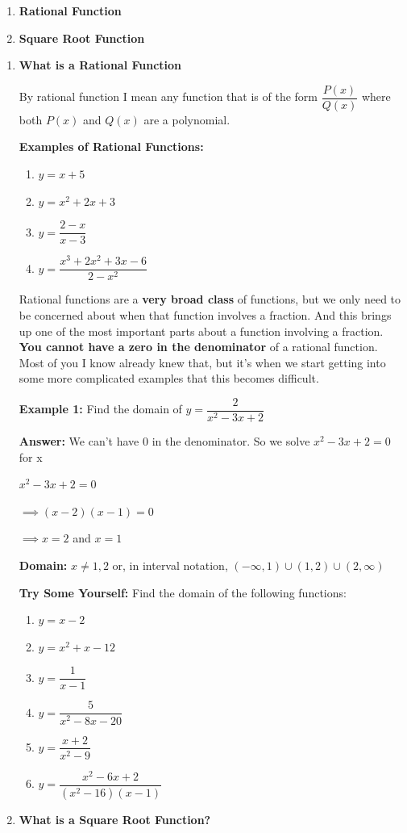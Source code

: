 \documentclass[12pt]{article}
\begin{document}
\begin{enumerate}
\item \textbf{Rational Function}
\item \textbf{Square Root Function}
\end{enumerate}
\hrulefill
\begin{enumerate}
\item \textbf{What is a Rational Function}

By rational function I mean any function that is of the form $\dfrac{P(x)}{Q(x)}$ where both $P(x)$ and $Q(x)$ are a polynomial. 

\textbf{Examples of Rational Functions:}

\begin{enumerate}
\item $y  = x+5$
\item $y = x^2+2x+3$
\item $y = \dfrac{2-x}{x-3}$
\item $y = \dfrac{x^3+2x^2+3x-6}{2-x^2}$
\end{enumerate}

Rational functions are a \textbf{very broad class} of functions, but we only need to be concerned about when that function involves a fraction. And this brings up one of the most important parts about a function involving a fraction. \textbf{You cannot have a zero in the denominator} of a rational function. Most of you I know already knew that, but it's when we start getting into some more complicated examples that this becomes difficult.
\newpage

\textbf{Example 1:} Find the domain of $y = \dfrac{2}{x^2-3x+2}$

\textbf{Answer:} We can't have $0$ in the denominator. So we solve $x^2-3x+2=0$ for x

\hspace{1.1cm}$x^2-3x+2=0$

$\implies (x-2)(x-1) = 0$

$\implies x = 2$ and $x=1$

\textbf{Domain:} $x \neq 1,2$ or, in interval notation, $(-\infty,1) \cup (1,2) \cup (2, \infty)$

\textbf{Try Some Yourself:} Find the domain of the following functions:

\begin{enumerate}
\item $y = x-2$
\item $y = x^2+x-12$
\item $y = \dfrac{1}{x-1}$
\item $y = \dfrac{5}{x^2-8x-20}$
\item $y = \dfrac{x+2}{x^2-9}$
\item $y = \dfrac{x^2-6x+2}{(x^2-16)(x-1)}$
\end{enumerate}
\hrulefill
\item \textbf{What is a Square Root Function?}


\end{enumerate}
\end{document}
